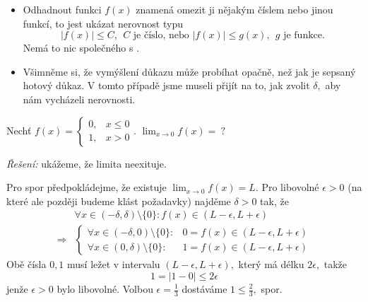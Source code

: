 \begin{poznámka}\leavevmode
\begin{itemize}
	\item Odhadnout funkci $f(x)$ znamená omezit ji nějakým číslem nebo jinou funkcí, to jest ukázat nerovnost typu
	\begin{equation*}
		|f(x)| \leq C, \ \ C \text{ je číslo, nebo } |f(x)|\leq g(x), \ \ g \text{ je funkce.}
	\end{equation*}
	Nemá to nic společného s .
	\item Všimněme si, že vymýšlení důkazu může probíhat opačně, než jak je sepsaný hotový důkaz. V tomto případě jsme museli přijít na to, jak zvolit $\delta,$ aby nám vycházeli nerovnosti.
\end{itemize}
\end{poznámka}

\begin{příklad}\label{pr:neexistence limity}
  Nechť $f(x)=\left\{
  \begin{matrix}
	  0, & x\leq 0 \\
	  1, & x>0
\end{matrix}\right.$. \hspace{1em}$\lim_{x\to 0}f(x)=\ ?$\par
\textit{Řešení:} ukážeme, že limita neexituje.
\begin{důkaz}
	Pro spor předpokládejme, že existuje $\lim_{x\to 0}f(x)=L.$ Pro libovolné $\epsilon>0$ (na které ale později budeme klást požadavky) najděme $\delta>0$ tak, že
	\begin{align*}
		&\forall x\in (-\delta,\delta)\setminus\{0\} \colon f(x)\in (L-\epsilon, L+\epsilon) \\
		\Rightarrow &\left\{\begin{matrix}\forall x\in (-\delta,0)\setminus\{0\}\colon &0=f(x)\in (L-\epsilon, L+\epsilon) \\
				\forall x\in (0,\delta)\setminus\{0\}\colon &1=f(x)\in (L-\epsilon, L+\epsilon)
	\end{matrix}\right.
	\end{align*}
	Obě čísla $0, 1$ musí ležet v intervalu $(L-\epsilon,L+\epsilon),$ který má délku $2\epsilon,$ takže
	\begin{equation*}
	  1=|1-0|\leq 2\epsilon
	\end{equation*}
	jenže $\epsilon>0$ bylo libovolné. Volbou $\epsilon=\frac{1}{3}$ dostáváme $1\leq \frac{2}{3},$ spor.
\end{důkaz}
\end{příklad}

